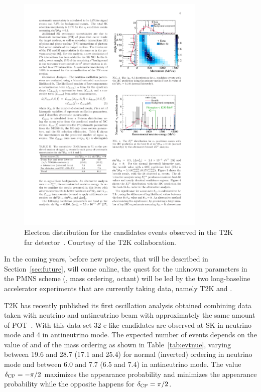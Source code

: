 \begin{figure} [htbp!]
\begin{center}
\includegraphics[width=9cm]{figures/nueapp_ptheta.pdf}
\caption{\label{fig:t2kapp} Electron \ptheta distribution for the \nue candidates events observed in the T2K far detector~\cite{Abe:2013hdq}. Courtesy of the T2K collaboration.}
\end{center}
\end{figure}





In the coming years, before new projects, that will be described in Section~\ref{sec:future}, will come online, the quest for the unknown parameters in the PMNS scheme (\dcp, mass ordering, \thatm octant) will be led by the two long-baseline accelerator experiments that are currently taking data, namely T2K and \nova.

T2K has recently published its first oscillation analysis obtained combining data taken with neutrino and antineutrino beam with approximately the same amount of POT~\cite{t2k2016}. With this data set 32 e-like candidates are observed at SK in neutrino mode and 4 in antineutrino mode. The expected number of events depends on the value of \dcp and of the mass ordering as shown in Table~\ref{tab:evtnue}, varying between 19.6 and 28.7 (17.1 and 25.4) for normal (inverted) ordering in neutrino mode and between 6.0 and 7.7 (6.5 and 7.4) in antineutrino mode. The value $\delta_{\mathrm{CP}}=-\pi/2$ maximizes the \nue appearance probability and minimizes the \nueb appearance probability while the opposite happens for $\delta_{\mathrm{CP}}=\pi/2$. 

